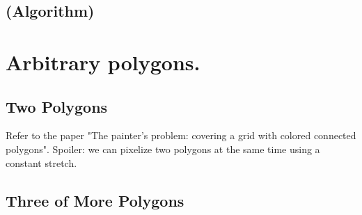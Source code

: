 \documentclass[a4paper, UKenglish]{lipics-v2018}
\begin{document}

\subsection{(Algorithm)}
\label{sub:convex_algo}






\section{Arbitrary polygons.}
\label{sec:arbitrary}

\subsection{Two Polygons}

Refer to the paper "The painter’s problem: covering a grid with colored connected polygons".
Spoiler: we can pixelize two polygons at the same time using a constant stretch.

\subsection{Three of More Polygons}
\end{document}
